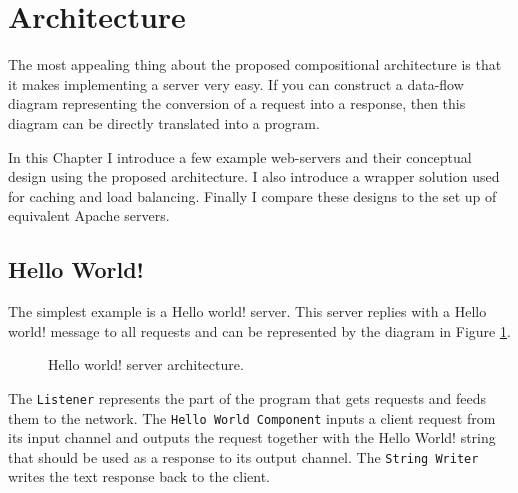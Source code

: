 \documentclass[12pt,a4paper]{article}
\begin{document}

\newpage
\section{Architecture}
\label{sec:arch}
The most appealing thing about the proposed compositional architecture is that
it makes implementing a server very easy. If you can construct a data-flow diagram 
representing the conversion of a request into a response, then this diagram
can be directly translated into a program.

In this Chapter I introduce a few example web-servers and their conceptual
design using the proposed architecture. I also introduce a wrapper 
solution used for caching and load balancing.
Finally I compare these designs to the set up of equivalent Apache servers.

\subsection{Hello World!}
\label{sec:helloWorld}
The simplest example is a Hello world! server. This server replies with a 
Hello world! message to all requests and can be represented by the diagram
in Figure \ref{fig:helloWorld}.

\begin{figure}[h]
\centering
{}
\caption[scale=1.0]{Hello world! server architecture.}
\label{fig:helloWorld}
\end{figure}

The \texttt{Listener} represents the 
part of the program that gets requests and feeds them to the network.
The \texttt{Hello World Component} inputs a client request from its input channel
and outputs the request together with the Hello World! string that should be 
used as a response to its output channel.
The \texttt{String Writer} writes the text response back to the client.
\end{document}
